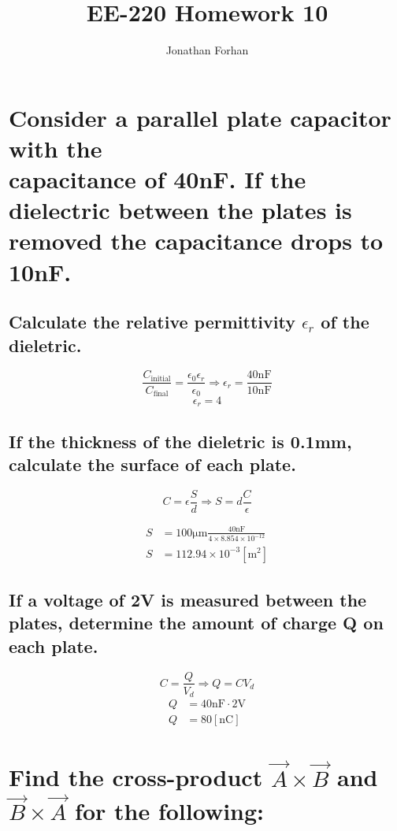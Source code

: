 \documentclass[14pt]{extarticle}
\title{EE-220 Homework 10}
\author{Jonathan Forhan}
\date{ }
\begin{document}
\maketitle

\boldmath
\section{Consider a parallel plate capacitor with the \\
  capacitance of 40nF. If the dielectric between the
  plates is removed the capacitance drops to 10nF.}
\unboldmath

\boldmath
\subsection{Calculate the relative permittivity $\epsilon_r$ of the dieletric.}
\unboldmath

$$\frac{C_{\mathrm{initial}}}{C_{\mathrm{final}}}=\frac{\epsilon_0\epsilon_r}{\epsilon_0}\Rightarrow\epsilon_r=\frac{40\mathrm{nF}}{10\mathrm{nF}}$$
$$\epsilon_r=4$$

\boldmath
\subsection{If the thickness of the dieletric is 0.1mm, calculate the surface of each plate.}
\unboldmath

$$C=\epsilon\frac{S}{d}\Rightarrow S=d\frac{C}{\epsilon}$$

\begin{align*}
	S & =100\mathrm{\mu m}\frac{40\mathrm{nF}}{4\times8.854\times10^{-12}} \\
	S & =112.94\times10^{-3}\mathrm{\left[m^2\right]}
\end{align*}

\boldmath
\subsection{If a voltage of 2V is measured between the plates, determine the amount of charge Q on each plate.}
\unboldmath

$$C=\frac{Q}{V_d}\Rightarrow Q=CV_d$$
\begin{align*}
	Q & =40\mathrm{nF}\cdot 2\mathrm{V} \\
	Q & =80\mathrm{\left[nC\right]}
\end{align*}

\boldmath
\section{Find the cross-product $\vec{A}\times\vec{B}$ and $\vec{B}\times\vec{A}$ for the following:}
\unboldmath
\end{document}
